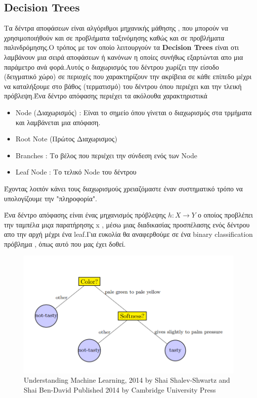 \documentclass[12pt,a4paper]{article}
\begin{document}
\subsection{Decision Trees}
Τα δέντρα αποφάσεων είναι αλγόριθμοι μηχανικής μάθησης , που μπορούν να χρησιμοποιήθούν και σε προβλήματα ταξινόμησης καθώς και σε προβλήματα παλινδρόμησης.Ο τρόπος με τον οποίο λειτουργούν τα \textbf{Decision Trees} είναι οτι λαμβάνουν μια σειρά αποφάσεων ή κανόνων η οποίες συνήθως εξαρτώνται απο μια παράμετρο ανά φορά.Αυτός ο διαχωρισμός του δέντρου χωρίζει την είσοδο (δειγματικό χώρο) σε περιοχές που χαρακτηρίζουν την ακρίβεια σε κάθε επίπεδο μέχρι να καταλήξουμε στο βάθος (τερματισμό) του δέντρου όπου περιέχει και την τλεική πρόβλεψη.Ένα δέντρο απόφασης περιέχει τα ακόλουθα χαρακτηριστικά
\begin{itemize}
\item Node (Διαχωρισμός) : Είναι το σημείο όπου γίνεται ο διαχωρισμός στα τρμήματα και λαμβάνεται μια απόφαση.

\item Root Note (Πρώτος Διαχωρισμος)
\item Branches : Το βέλος που περιέχει την σύνδεση ενός των Node

\item Leaf Node : Το τελικό Node του δέντρου

\end{itemize}

Έχοντας λοιπόν κάνει τους διαχωρισμούς χρειαζόμαστε έναν συστηματικό τρόπο να υπολογίζουμε την "πληροφορία".


Ένα δέντρο απόφασης είναι ένας μηχανισμός πρόβλεψης $h : X \to Y$ ο οποίος προβλέπει την ταμπέλα μιςα παρατήρησης x , μέσω μιας διαδικασίας προσπέλασης ενός δέντρου απο την αρχή μέχρι ένα leaf.Για ευκολία θα αναφερθούμε σε ένα binary classification πρόβλημα , όπως αυτό που μας έχει δοθεί.


\begin{figure}[H]
\centering
\includegraphics[width=0.40\linewidth,height=0.30\textheight]{Images/plot21}
\caption{Understanding Machine Learning,
 2014 by Shai Shalev-Shwartz and Shai Ben-David
Published 2014 by Cambridge University Press}
\label{fig:multi}
\end{figure}
\end{document}
